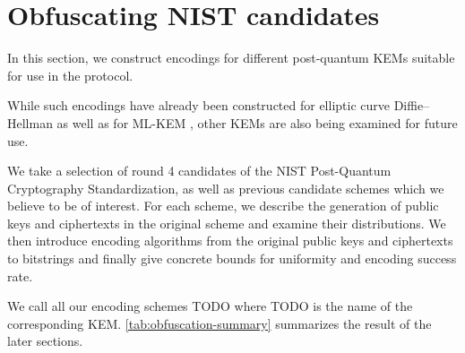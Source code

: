 \chapter{Obfuscating NIST candidates}\label{ch:obfuscation}

In this section, we construct encodings for different post-quantum KEMs suitable for use in the \pqobfs protocol.

While such encodings have already been constructed for elliptic curve Diffie–Hellman \cite{CCS:BHKL13, tor-dev-udh, USENIX:WWGH11} as well as for ML-KEM \cite{CCS:GunSteVei24}, other KEMs are also being examined for future use.

We take a selection of round 4 candidates of the NIST Post-Quantum Cryptography Standardization, as well as previous candidate schemes which we believe to be of interest.
For each scheme, we describe the generation of public keys and ciphertexts in the original scheme and examine their distributions. We then introduce encoding algorithms from the original public keys and ciphertexts to bitstrings and finally give concrete bounds for uniformity and encoding success rate.

We call all our encoding schemes TODO where TODO is the name of the corresponding KEM. \cref{tab:obfuscation-summary} summarizes the result of the later sections.

